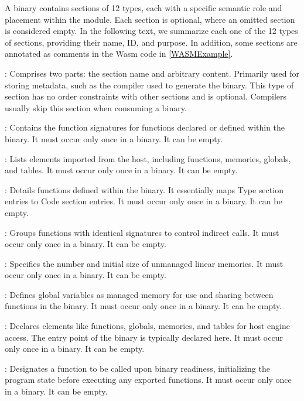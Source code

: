 A \wasm binary contains sections of 12 types, each with a specific semantic role and placement within the module. 
Each section is optional, where an omitted section is considered empty.
In the following text, we summarize each one of the 12 types of \wasm sections, providing their name, ID, and purpose. 
In addition, some sections are annotated as comments in the Wasm code in \autoref{WASMExample}.


: Comprises two parts: the section name and arbitrary content. Primarily used for storing metadata, such as the compiler used to generate the binary. This type of section has no order constraints with other sections and is optional. Compilers usually skip this section when consuming a \Wasm binary. 

: Contains the function signatures for functions declared or defined within the binary. It must occur only once in a binary. It can be empty.

: Lists elements imported from the host, including functions, memories, globals, and tables. It must occur only once in a binary. It can be empty.

: Details functions defined within the binary. It essentially maps Type section entries to Code section entries. It must occur only once in a binary. It can be empty.

: Groups functions with identical signatures to control indirect calls. It must occur only once in a binary. It can be empty.

: Specifies the number and initial size of unmanaged linear memories. It must occur only once in a binary. It can be empty. 

: Defines global variables as managed memory for use and sharing between functions in the \Wasm binary. It must occur only once in a binary. It can be empty.

: Declares elements like functions, globals, memories, and tables for host engine access. The entry point of the \Wasm binary is typically declared here. It must occur only once in a binary. It can be empty.

:  Designates a function to be called upon binary readiness, initializing the \Wasm program state before executing any exported functions. It must occur only once in a binary. It can be empty.

